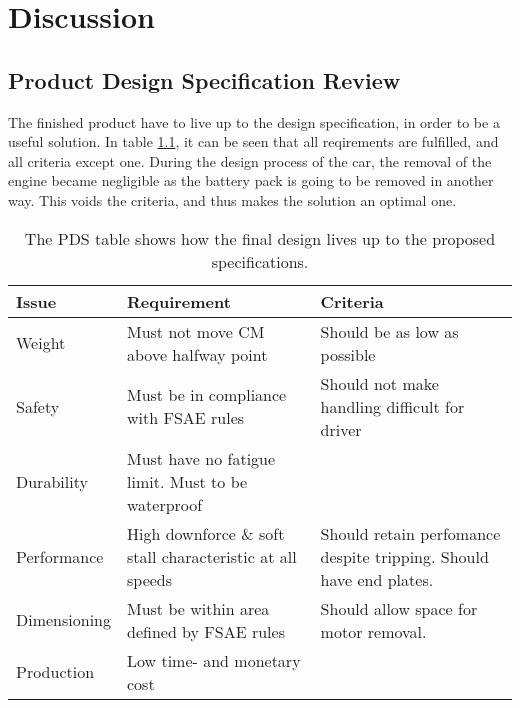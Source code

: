\chapter{Discussion}

\section{Product Design Specification Review}

  The finished product have to live up to the design specification, in order to be a useful solution. In table \ref{tab:designreview}, it can be seen that all reqirements are fulfilled, and all criteria except one. During the design process of the car, the removal of the engine became negligible as the battery pack is going to be removed in another way. This voids the criteria, and thus makes the solution an optimal one.

  \begin{table}
    \begin{tabularx}{\textwidth}[t]{>{\columncolor{seapurple!40}}l XX}
      \arrayrulecolor{seapurple}\hline
      \rowcolor{white}
      \textbf{\textcolor{seapurple}{Issue}} & \textbf{\textcolor{seapurple}{Requirement}} & \textbf{\textcolor{seapurple}{Criteria}}\\
      \hline
      Weight & \cellcolor{seagreen!40}Must not move CM above halfway point & \cellcolor{seagreen!40}Should be as low as possible \\
      Safety & \cellcolor{seagreen!40}Must be in compliance with FSAE rules & \cellcolor{seagreen!40}Should not make handling difficult for driver\\
      Durability & \cellcolor{seagreen!40} Must have no fatigue limit. Must to be waterproof \\
      Performance & \cellcolor{seagreen!40} High downforce \& soft stall characteristic at all speeds &\cellcolor{seagreen!40} Should retain perfomance despite tripping. Should have end plates.\\
      Dimensioning & \cellcolor{seagreen!40} Must be within area defined by FSAE rules & \cellcolor{seayellow!40} Should allow space for motor removal. \\
      Production & \cellcolor{seagreen!40} Low time- and monetary cost
      \label{tab:designreview}
    \end{tabularx}
    \caption{The PDS table shows how the final design lives up to the proposed specifications.}
  \end{table}
